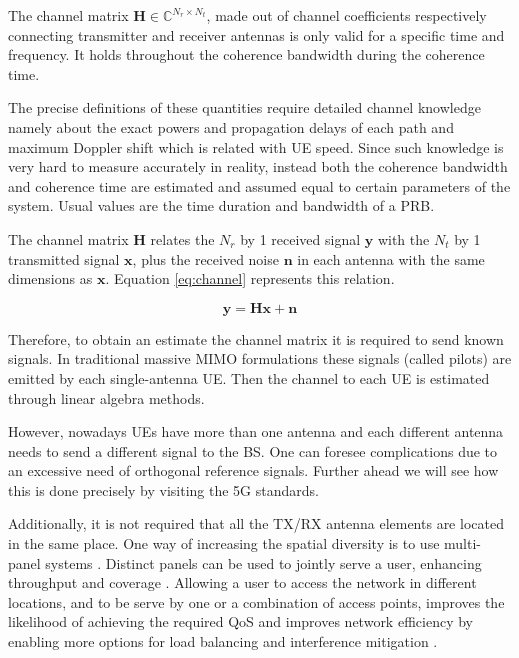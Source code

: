 

The channel matrix $\bm{H} \in \mathbb{C}^{N_r \times N_t}$, made out of channel coefficients respectively connecting transmitter and receiver antennas is only valid for a specific time and frequency. It holds throughout the coherence bandwidth during the coherence time. 


The precise definitions of these quantities require detailed channel knowledge namely about the exact powers and propagation delays of each path and maximum Doppler shift which is related with \ac{UE} speed. Since such knowledge is very hard to measure accurately in reality, instead both the coherence bandwidth and coherence time are estimated and assumed equal to certain parameters of the system. Usual values are the time duration and bandwidth of a \ac{PRB}. %

The channel matrix $\bm{H}$ relates the $N_r$ by 1 received signal $\bm{y}$ with the $N_t$ by 1 transmitted signal $\bm{x}$, plus the received noise $\bm{n}$ in each antenna with the same dimensions as $\bm{x}$. Equation \eqref{eq:channel} represents this relation.


\begin{equation} \label{eq:channel}
    \bm{y} = \bm{H} \bm{x} + \bm{n}
\end{equation}


Therefore, to obtain an estimate the channel matrix it is required to send known signals. In traditional massive MIMO formulations these signals (called pilots) are emitted by each single-antenna \ac{UE}. Then the channel to each \ac{UE} is estimated through linear algebra methods.

However, nowadays \acp{UE} have more than one antenna and each different antenna needs to send a different signal to the \ac{BS}. One can foresee complications due to an excessive need of orthogonal reference signals. Further ahead we will see how this is done precisely by visiting the 5G standards. 

Additionally, it is not required that all the \ac{TX}/\ac{RX} antenna elements are located in the same place. One way of increasing the spatial diversity is to use multi-panel systems \cite{8316768}. Distinct panels can be used to jointly serve a user, enhancing throughput and coverage \cite{6804225}. Allowing a user to access the network in different locations, and to be serve by one or a combination of access points, improves the likelihood of achieving the required QoS and improves network efficiency by enabling more options for load balancing and interference mitigation \cite{dmimo_tno}.

